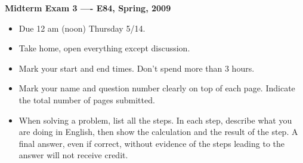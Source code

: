 \usepackage{html}

\begin{center}
{\Large \bf  Midterm Exam 3 ---- E84, Spring, 2009}
\end{center}

\begin{itemize}
\item Due 12 am (noon) Thursday 5/14.
\item Take home, open everything except discussion.
\item Mark your start and end times. Don't spend more than 3 hours.
\item Mark your name and question number clearly on top of each page.
	Indicate the total number of pages submitted.
\item When solving a problem, list all the steps. In each step, describe 
	what you are doing in English, then show the calculation and the 
	result of the step. A final answer, even if correct, without 
	evidence of the steps leading to the answer will not receive credit.
\end{itemize}

